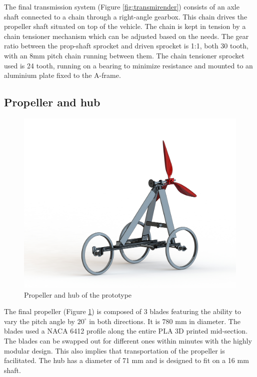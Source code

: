 The final transmission system  (Figure \ref{fig:transmirender}) consists of an axle shaft connected to a chain through a right-angle gearbox. This chain drives the propeller shaft situated on top of the vehicle. The chain is kept in tension by a chain tensioner mechanism which can be adjusted based on the needs. The gear ratio between the prop-shaft sprocket and driven sprocket is 1:1, both 30 tooth, with an 8mm pitch chain running between them. The chain tensioner sprocket used is 24 tooth, running on a bearing to minimize resistance and mounted to an aluminium plate fixed to the A-frame.

\subsection{Propeller and hub}

\begin{figure}[H]
    \centering
    \includegraphics[width = 0.5\linewidth]{images/renders/prop.JPG}
    \caption{Propeller and hub of the prototype}
    \label{fig:proprender}
\end{figure}


The final propeller (Figure \ref{fig:proprender}) is composed of 3 blades featuring the ability to vary the pitch angle by $20^\circ$ in both directions. It is 780 mm in diameter. The blades used a NACA 6412 profile along the entire PLA 3D printed mid-section. The blades can be swapped out for different ones within minutes with the highly modular design. This also implies that transportation of the propeller is facilitated. The hub has a diameter of 71 mm and is designed to fit on a 16 mm shaft.

